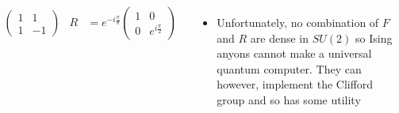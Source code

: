 \documentclass[20pt,,margin=1in,innermargin=-4.5in,blockverticalspace=-0.25in]{tikzposter}
\begin{document}
\begin{columns}
{\begin{align*}
\begin{pmatrix}
                1&1\\1&-1
            \end{pmatrix} & R&=e^{-i\frac{\pi}{8}}
            \begin{pmatrix}
                1&0\\0&e^{i\frac{\pi}{2}}
            \end{pmatrix}
        \end{align*}
        \begin{itemize}
            \item Unfortunately, no combination of $F$ and $R$ are dense in $SU(2)$ so Ising anyons cannot make a universal quantum computer. They can however, implement the Clifford group and so has some utility
        \end{itemize}
    }
    
\end{columns}
\end{document}
